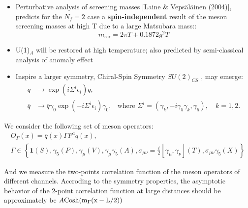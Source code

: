 \documentclass[10pt, aspectratio=169]{beamer} %
\begin{document}
\begin{frame}
\fontsize{10pt}{12pt}\selectfont
\vfill

\begin{itemize}
\item Perturbative analysis of screening masses  {\scriptsize{[Laine \& Vepsäläinen (2004)]}}, predicts for the $N_f=2$ case a \textbf{spin-independent} result of the meson screening masses at
high T due to a large Matsubara mass::
\[ m_{\mathrm{scr}} = 2\pi T + 0.1872 g^2 T \]
\item U(1)$_A$ will be restored at high temperature; also predicted by semi-classical analysis of anomaly effect
\item
Inspire a larger symmetry, Chiral-Spin Symmetry $SU(2)_{CS}$ , may emerge:
\begin{align*}
    q &\to \exp(i\Sigma^i\epsilon_i)q, \\
    \bar{q} &\to \bar{q}\gamma_0 \exp(-i\Sigma^i\epsilon_i)\gamma_0,& \text{where } \Sigma^i = (\gamma_k, -i\gamma_5\gamma_k, \gamma_5), \quad k = 1, 2. 
\end{align*}

\end{itemize}
\vfill
\end{frame}



\begin{frame}
\vfill
We consider the
following set of meson operators:
\begin{gather*}
    O_\Gamma(x) = \bar{q}(x)\Gamma F^aq(x), \\[2ex]
    \Gamma \in \left\{ \mathbf{1}(S), \gamma_5(P), \gamma_\mu(V), \gamma_\mu\gamma_5(A), \sigma_{\mu\nu} = \frac{i}{2}[\gamma_\mu, \gamma_\nu](T), \sigma_{\mu\nu}\gamma_5(X) \right\}
\end{gather*}

And we measure the two-points correlation function of the meson operators of different channels.
Accroding to the symmetry properties, the asymptotic behavior of the 2-point correlation function at large distances should be approximately be $A \rm{Cosh}(m_\Gamma(x-L/2)) $
\vfill
\end{frame}
\end{document}
